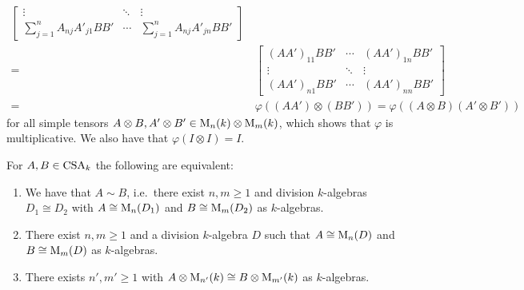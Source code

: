 \begin{remark}
\begin{align*}
\begin{bmatrix}
            \vdots                            & \ddots  & \vdots                            \\
            \sum_{j=1}^n A_{nj} A'_{j1} B B'  & \cdots  & \sum_{j=1}^n A_{nj} A'_{jn} B B'
          \end{bmatrix}
          \\
    =&\,  \begin{bmatrix}
            (A A')_{11} B B' & \cdots  & (A A')_{1n} B B' \\
            \vdots           & \ddots  & \vdots           \\
            (A A')_{n1} B B' & \cdots  & (A A')_{nn} B B'
          \end{bmatrix}
    \\
    =&\,  \varphi((A A') \otimes (B B'))
    =     \varphi((A \otimes B) (A' \otimes B'))
  \end{align*}
  \endgroup
  for all simple tensors $A \otimes B, A' \otimes B' \in \operatorname{M}_n(k) \otimes \operatorname{M}_m(k)$, which shows that $\varphi$ is multiplicative.
  We also have that $\varphi(I \otimes I) = I$.
\end{remark}


\begin{lemma}
  \label{lemma: characterization of Brauer equivalence}
  For $A, B \in \operatorname{CSA}_k$ the following are equivalent:
  \begin{enumerate}
    \item
      \label{enumerate: matrices over isomorphic division algebra}
      We have that $A \sim B$, i.e.\ there exist $n, m \geq 1$ and division $k$-algebras $D_1 \cong D_2$ with $A \cong \operatorname{M}_n(D_1)$ and $B \cong \operatorname{M}_m(D_2)$ as $k$-algebras.
    \item
      \label{enumerate: matrices over same division algebra}
      There exist $n, m \geq 1$ and a division $k$-algebra $D$ such that $A \cong \operatorname{M}_n(D)$ and $B \cong \operatorname{M}_m(D)$ as $k$-algebras.
    \item
      \label{enumerate: up to tensor with a matrix ring}
      There exists $n', m' \geq 1$ with $A \otimes \operatorname{M}_{n'}(k) \cong B \otimes \operatorname{M}_{m'}(k)$ as $k$-algebras.
  \end{enumerate}
\end{lemma}



